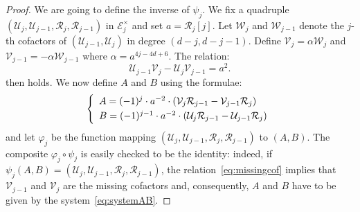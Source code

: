 \documentclass{article}
\begin{document}
\begin{proof} 
We are going to define the inverse of $\psi_j$. We fix a quadruple 
$(\mathcal U_j, \mathcal U_{j-1}, \mathcal R_j, \mathcal R_{j-1})$ in 
$\mathcal E_j^\times$ and set $a = \mathcal R_j[j]$.
Let $\mathcal W_j$ and $\mathcal W_{j-1}$ denote 
the $j$-th cofactors of $(\mathcal U_{j-1}, \mathcal U_j)$ in degree 
$(d{-}j, d{-}j{-}1)$. Define $\mathcal V_j = \alpha \mathcal W_j$ and 
$\mathcal V_{j-1} = -\alpha \mathcal W_{j-1}$ where $\alpha =
a^{4j-4d+6}$. The relation:
\begin{equation}
\label{eq:missingcof}
\mathcal U_{j-1} \mathcal V_j - 
\mathcal U_j \mathcal V_{j-1} = a^2.
\end{equation}
then holds. We now define $A$ and $B$ using the formulae:
\begin{equation}
\label{eq:systemAB}
\left\{\begin{array}{l}
A = (-1)^j \cdot a^{-2} \cdot (\mathcal V_j \mathcal R_{j-1} - \mathcal V_{j-1} \mathcal R_j) \smallskip \\
B = (-1)^{j-1} \cdot a^{-2} \cdot (\mathcal U_j \mathcal R_{j-1} - \mathcal U_{j-1} \mathcal R_j) \\
\end{array}\right.
\end{equation}
and let $\varphi_j$ be the function mapping $(\mathcal U_j, \mathcal 
U_{j-1}, \mathcal R_j, \mathcal R_{j-1})$ to $(A,B)$. The composite 
$\varphi_j \circ \psi_j$ is easily checked to be the identity: indeed, 
if $\psi_j(A,B) = (\mathcal U_j, \mathcal U_{j-1}, \mathcal R_j, 
\mathcal R_{j-1})$, the relation~\eqref{eq:missingcof} implies that 
$\mathcal V_{j-1}$ and $\mathcal V_j$ are the missing cofactors and, 
consequently, $A$ and $B$ have to be given by the 
system~\eqref{eq:systemAB}.


\end{proof}
\end{document}
